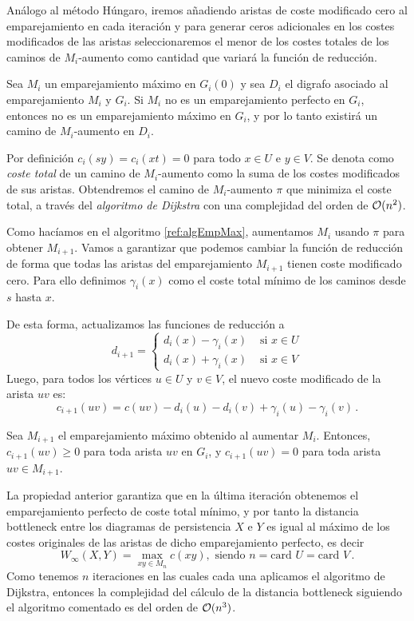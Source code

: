Análogo al método Húngaro, iremos añadiendo aristas de coste modificado cero al emparejamiento en cada iteración y para generar ceros adicionales en los costes modificados de las aristas seleccionaremos el menor de los costes totales de los caminos de $M_i$-aumento como cantidad que variará la función de reducción.

Sea $M_i$ un emparejamiento máximo en $G_i(0)$ y sea $D_i$ el digrafo asociado al emparejamiento $M_i$ y $G_i$. Si $M_i$ no es un emparejamiento perfecto en $G_i$, entonces no es un emparejamiento máximo en $G_i$, y por lo tanto existirá un camino de $M_i$-aumento en $D_i$.

Por definición $c_i(sy) = c_i(xt) = 0$ para todo $x \in U$ e $y \in V$. Se denota como \emph{coste total} de un camino de $M_i$-aumento como la suma de los costes modificados de sus aristas. Obtendremos el camino de $M_i$-aumento $\pi$ que minimiza el coste total, a través del \emph{algoritmo de Dijkstra} \cite{dijkstra1959note} con una complejidad del orden de $\mathcal{O}(n^2)$.

Como hacíamos en el algoritmo \ref{ref:algEmpMax}, aumentamos $M_i$ usando $\pi$ para obtener $M_{i+1}$. Vamos a garantizar que podemos cambiar la función de reducción de forma que todas las aristas del emparejamiento $M_{i+1}$ tienen coste modificado cero. Para ello definimos $\gamma_i(x)$ como el coste total mínimo de los caminos desde $s$ hasta $x$.

De esta forma, actualizamos las funciones de reducción a
\[
d_{i+1} = \begin{cases}
d_i(x) - \gamma_i(x) & \text{ si } x \in U \\ 
d_i(x) + \gamma_i(x) & \text{ si } x \in V 
\end{cases}
\]
Luego, para todos los vértices $u \in U$ y $v \in V$, el nuevo coste modificado de la arista $uv$ es:
\[
c_{i+1}(uv)=c(uv) - d_i(u) - d_i(v) + \gamma_i(u) - \gamma_i(v)\,.
\]

\begin{property}
Sea $M_{i+1}$ el emparejamiento máximo obtenido al aumentar $M_i$. Entonces, $c_{i+1}(uv) \geq 0$ para toda arista $uv$ en $G_i$, y  $c_{i+1}(uv) = 0$ para toda arista $uv \in M_{i+1}$.
\end{property}

La propiedad anterior garantiza que en la última iteración obtenemos el emparejamiento perfecto de coste total mínimo, y por tanto la distancia bottleneck entre los diagramas de persistencia $X$ e $Y$ es igual al máximo de los costes originales de las aristas de dicho emparejamiento perfecto, es decir
\[
W_\infty(X,Y)=\max_{xy \in M_n} c(xy),\text{ siendo } n= \text{card } U = \text{card } V\,.
\]
Como tenemos $n$ iteraciones en las cuales cada una aplicamos el algoritmo de Dijkstra, entonces la complejidad del cálculo de la distancia bottleneck siguiendo el algoritmo comentado es del orden de $\mathcal{O}(n^3)$.

